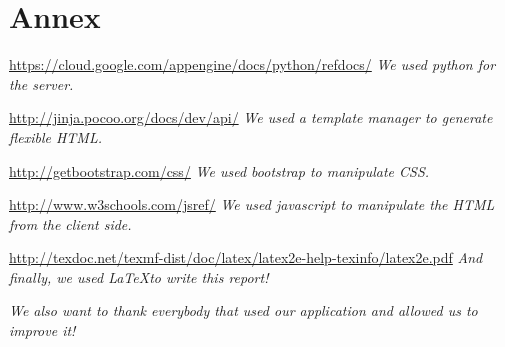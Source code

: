 \section*{Annex}

\url{https://cloud.google.com/appengine/docs/python/refdocs/} \linebreak
\emph{We used python for the server.}

\url{http://jinja.pocoo.org/docs/dev/api/} \linebreak
\emph{We used a template manager to generate flexible HTML.}

\url{http://getbootstrap.com/css/} \linebreak
\emph{We used bootstrap to manipulate CSS.}

\url{http://www.w3schools.com/jsref/} \linebreak
\emph{We used javascript to manipulate the HTML from the client side.}

\url{http://texdoc.net/texmf-dist/doc/latex/latex2e-help-texinfo/latex2e.pdf} \linebreak
\emph{And finally, we used \LaTeX to write this report!} 

\emph{We also want to thank everybody that used our application and allowed us to improve it!}
